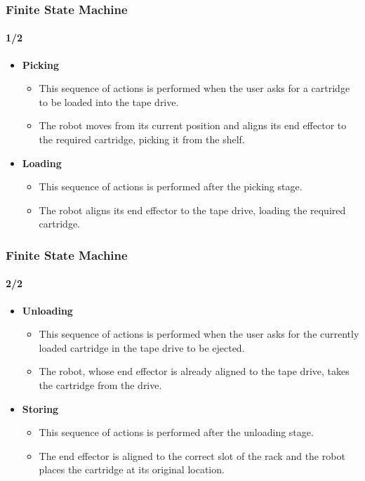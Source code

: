 \documentclass[12pt]{beamer}
\begin{document}
\begin{frame}
\frametitle{Finite State Machine}
\framesubtitle{1/2}
\begin{itemize}
    \item \textbf{Picking}
    \begin{itemize}
        \item This sequence of actions is performed when the user asks for a cartridge to be loaded into the tape drive.
        \item The robot moves from its current position and aligns its end effector to the required cartridge, picking it from the shelf.
    \end{itemize}
    \item \textbf{Loading}
        \begin{itemize}
            \item This sequence of actions is performed after the picking stage.
            \item The robot aligns its end effector to the tape drive, loading the required cartridge.
        \end{itemize}
\end{itemize}
\end{frame}

\begin{frame}
\frametitle{Finite State Machine}
\framesubtitle{2/2}
\begin{itemize}
    \item \textbf{Unloading}
    \begin{itemize}
        \item This sequence of actions is performed when the user asks for the currently loaded cartridge in the tape drive to be ejected.
        \item The robot, whose end effector is already aligned to the tape drive, takes the cartridge from the drive.
    \end{itemize}
    \item \textbf{Storing}
    \begin{itemize}
        \item This sequence of actions is performed after the unloading stage.
        \item The end effector is aligned to the correct slot of the rack and the robot places the cartridge at its original location.
    \end{itemize}
\end{itemize}
\end{frame}
\end{document}
